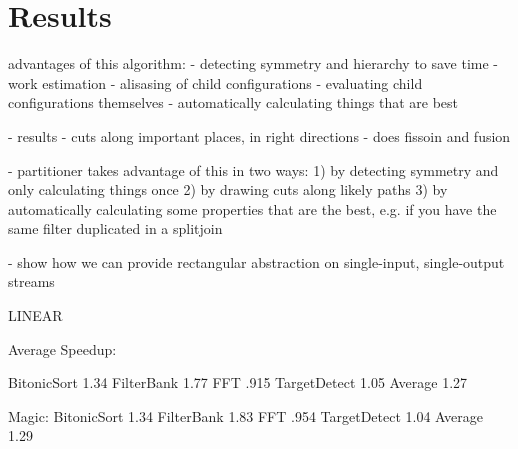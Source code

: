 \section{Results}
\label{sec:results}


advantages of this algorithm:
  - detecting symmetry and hierarchy to save time
    - work estimation
    - alisasing of child configurations
    - evaluating child configurations themselves
    - automatically calculating things that are best

- results
  - cuts along important places, in right directions
  - does fissoin and fusion

  - partitioner takes advantage of this in two ways: 
    1) by detecting symmetry and only calculating things once
    2) by drawing cuts along likely paths
    3) by automatically calculating some properties that are the best,
       e.g. if you have the same filter duplicated in a splitjoin

- show how we can provide rectangular abstraction on single-input, single-output streams

LINEAR


Average Speedup:

BitonicSort     1.34
FilterBank      1.77
FFT             .915
TargetDetect    1.05
Average         1.27

Magic:
BitonicSort     1.34
FilterBank      1.83
FFT             .954
TargetDetect    1.04
Average         1.29
